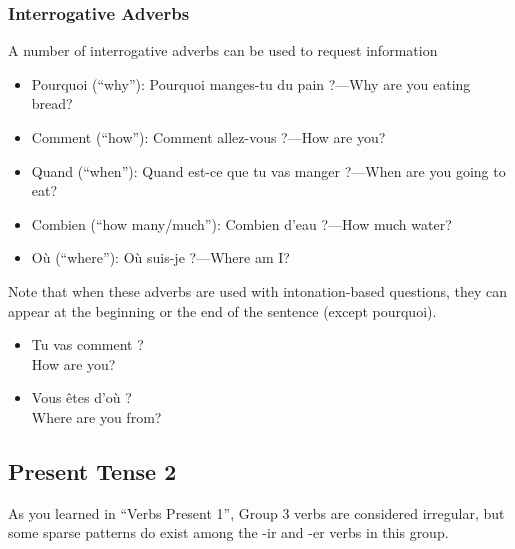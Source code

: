 \subsubsection{Interrogative Adverbs}

A number of interrogative adverbs can be used to request information

\begin{itemize}
  \item  Pourquoi (``why''): Pourquoi manges-tu du pain ?---Why are you eating bread?
  \item  Comment (``how''): Comment allez-vous ?---How are you?
  \item  Quand (``when''): Quand est-ce que tu vas manger ?---When are you going to eat?
  \item  Combien (``how many/much''): Combien d'eau ?---How much water?
  \item  O{\`u} (``where''): O{\`u} suis-je ?---Where am I?
\end{itemize}

Note that when these adverbs are used with intonation-based questions, they can appear at the beginning or the end of the sentence (except pourquoi).

\begin{itemize}
  \item  Tu vas comment ? \\ How are you?
  \item  Vous {\^e}tes d'o{\`u} ? \\ Where are you from?
\end{itemize}


\pagebreak
\subsection{Present Tense 2}

As you learned in ``Verbs Present 1'', Group 3 verbs are considered irregular, but some sparse patterns do exist among the -ir and -er verbs in this group.

